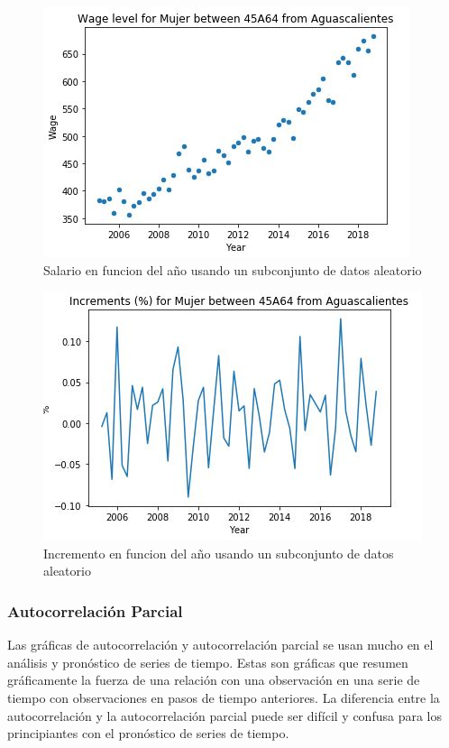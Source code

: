\begin{figure}[h!]
	\centering
	\includegraphics[width=0.8\linewidth]{Figure/AGSwageVSyear_visualizacionJPG.JPG}
	\caption{Salario en funcion del año usando un subconjunto de datos aleatorio} 
	\label{fig:AGSwageVSyear}
\end{figure}

\begin{figure}[h!]
	\centering
	\includegraphics[width=0.8\linewidth]{Figure/AGSIncrementsVSyear_visualizacion.JPG}
	\caption{Incremento en funcion del año usando un subconjunto de datos aleatorio} 
	\label{fig:AGSIncrementsVSyear}
\end{figure}


\subsubsection{Autocorrelaci\'on Parcial}
Las gr\'aficas de autocorrelaci\'on y autocorrelaci\'on parcial se usan mucho en el an\'alisis y pron\'ostico de series de tiempo.
Estas son gr\'aficas que resumen gr\'aficamente la fuerza de una relaci\'on con una observaci\'on en una serie de tiempo con observaciones en pasos de tiempo anteriores. La diferencia entre la autocorrelaci\'on y la autocorrelaci\'on parcial puede ser dif\'icil y confusa para los principiantes con el pron\'ostico de series de tiempo.

